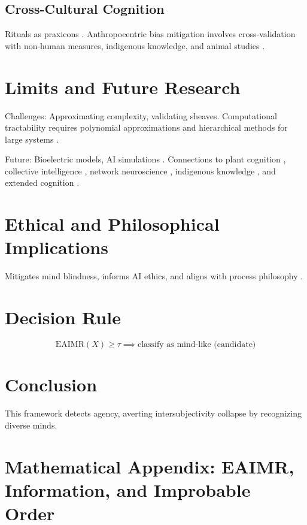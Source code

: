 \documentclass{article}
\begin{document}
\subsection{Cross-Cultural Cognition}
Rituals as praxicons \citep{ortega1961}. Anthropocentric bias mitigation involves cross-validation with non-human measures, indigenous knowledge, and animal studies \citep{kimmerer2013braiding}.

\section{Limits and Future Research}
\label{sec:limits}

Challenges: Approximating complexity, validating sheaves. Computational tractability requires polynomial approximations and hierarchical methods for large systems \citep{kolmogorov1965}.

Future: Bioelectric models, AI simulations \citep{levin2019}. Connections to plant cognition \citep{calvo2020plants}, collective intelligence \citep{camazine2001}, network neuroscience \citep{bassett2017network}, indigenous knowledge \citep{kimmerer2013braiding}, and extended cognition \citep{clark2010supersizing}.

\section{Ethical and Philosophical Implications}
\label{sec:ethics}

Mitigates mind blindness, informs AI ethics, and aligns with process philosophy \citep{dennett1987,whitehead1929,deleuze1987}.

\section{Decision Rule}
\label{sec:decision}

\[ \mathrm{EAIMR}(X) \ge \tau \implies \text{classify as mind-like (candidate)} \]

\section{Conclusion}
\label{sec:conclusion}

This framework detects agency, averting intersubjectivity collapse by recognizing diverse minds.

\appendix

\section{Mathematical Appendix: EAIMR, Information, and Improbable Order}
\label{app:math}
\end{document}
